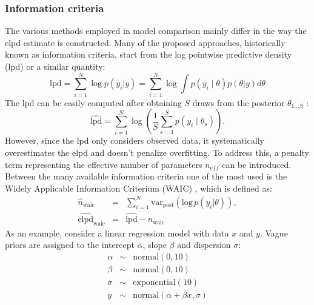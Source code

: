 \subsubsection*{Information criteria}
The various methods employed in model comparison mainly differ in the way the elpd estimate is constructed.
Many of the proposed approaches, historically known as information
criteria, start from the log pointwise predictive density (lpd) or a similar quantity:
\begin{equation}
\text{lpd}=\sum_{i=1}^{N} \log p(y_i|y) = \sum_{i=1}^{N} \log\int p(y_i\mid\theta) p(\theta|y) d\theta
\end{equation}
The lpd can be easily computed after obtaining $S$ draws from the posterior  $\theta_{1\ldots S}$ :
\begin{equation}
    \widehat{\text{lpd}}=\sum_{i=1}^{N}\log\left(\frac{1}{S}\sum_{s=1}^{S}p(y_{i}\mid \theta_{s})\right).
\end{equation}
However, since the lpd only considers observed data, it systematically overestimates the elpd and doesn't penalize
overfitting. To address this, a penalty term representing the effective number of parameters
$n_{eff}$ can be introduced. 
Between the many available information criteria one of the most used is the Widely Applicable Information
Criterium (WAIC) \cite{watanabe2013widely}, which is defined as:
\begin{eqnarray}
  \widehat{n}_{\mathrm{waic}} &=&\sum_{i=1}^{N}\mathrm{var_{post}}\left(\mathrm{log}\,p(y_{i}|\theta)\right),\\
    \widehat{\text{elpd}}_{\mathrm{waic}} &=& \widehat{\text{lpd}}- \widehat{n}_{\mathrm{waic}}
\end{eqnarray}
As an example, consider a linear regression model with data $x$ and $y$. Vague priors are
assigned to the intercept $\alpha$, slope $\beta$ and dispersion $\sigma$: 
 \begin{eqnarray}
   \alpha &\sim&  \text{normal}(0, 10) \\
   \beta &\sim &\text{normal}(0, 10) \\
   \sigma& \sim& \text{exponential}(10)\\
   y &\sim &\text{normal}(\alpha + \beta x, \sigma)
\end{eqnarray}


